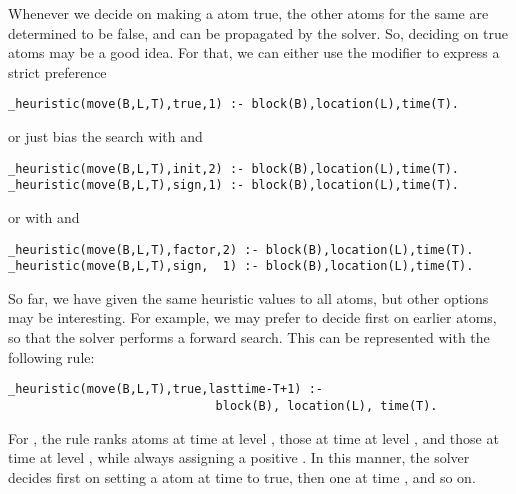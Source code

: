 \begin{example}
Whenever we decide on making a  atom true,  
the other  atoms for the same  are determined to be false,
and can be propagated by the solver. 
So, deciding on true  atoms may be a good idea.
For that, we can either use the  modifier to express a strict preference
\begin{lstlisting}[basicstyle=\small\ttfamily,numbers=none]
_heuristic(move(B,L,T),true,1) :- block(B),location(L),time(T).
\end{lstlisting}
or just bias the search with  and 
\begin{lstlisting}[basicstyle=\small\ttfamily,numbers=none]
_heuristic(move(B,L,T),init,2) :- block(B),location(L),time(T).
_heuristic(move(B,L,T),sign,1) :- block(B),location(L),time(T).
\end{lstlisting}
or with  and 
\begin{lstlisting}[basicstyle=\small\ttfamily,numbers=none]
_heuristic(move(B,L,T),factor,2) :- block(B),location(L),time(T).
_heuristic(move(B,L,T),sign,  1) :- block(B),location(L),time(T).
\end{lstlisting}

So far, we have given the same heuristic values to all  atoms,
but other options may be interesting. 
For example, we may prefer to decide first on earlier  atoms,
so that the solver performs a forward search. 
This can be represented with the following rule:
\begin{lstlisting}[basicstyle=\small\ttfamily,numbers=none]
_heuristic(move(B,L,T),true,lasttime-T+1) :- 
                             block(B), location(L), time(T).
\end{lstlisting}
For ,
the rule ranks  atoms at time  at level ,
those at time  at level , and 
those at time  at level ,
while always assigning a positive .  
In this manner, 
the solver decides first on setting a  atom at time  to true, 
then one at time , and so on.


\end{example}
